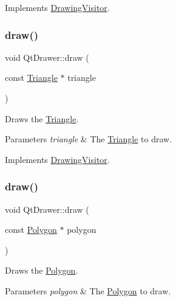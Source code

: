 Implements \hyperlink{class_drawing_visitor_a8a95018de31a7e3d7a067c347478ffde}{Drawing\+Visitor}.

\hypertarget{class_qt_drawer_a6d68080c84447a76b34810ca0330fd2c}{}\label{class_qt_drawer_a6d68080c84447a76b34810ca0330fd2c} 
\subsubsection{\texorpdfstring{draw()}{draw()}\hspace{0.1cm}{\footnotesize\ttfamily [3/5]}}
{\footnotesize\ttfamily void Qt\+Drawer\+::draw (\begin{DoxyParamCaption}\item[{const \hyperlink{class_triangle}{Triangle} $\ast$}]{triangle }\end{DoxyParamCaption})\hspace{0.3cm}{\ttfamily [virtual]}}

Draws the \hyperlink{class_triangle}{Triangle}. 
\begin{DoxyParams}{Parameters}
{\em triangle} & The \hyperlink{class_triangle}{Triangle} to draw. \\
\hline
\end{DoxyParams}


Implements \hyperlink{class_drawing_visitor_a178aa7e1bb9cfbd538d7de0dbfa2d4b1}{Drawing\+Visitor}.

\hypertarget{class_qt_drawer_a977cc5f97827eb36063f8429ef044727}{}\label{class_qt_drawer_a977cc5f97827eb36063f8429ef044727} 
\subsubsection{\texorpdfstring{draw()}{draw()}\hspace{0.1cm}{\footnotesize\ttfamily [4/5]}}
{\footnotesize\ttfamily void Qt\+Drawer\+::draw (\begin{DoxyParamCaption}\item[{const \hyperlink{class_polygon}{Polygon} $\ast$}]{polygon }\end{DoxyParamCaption})\hspace{0.3cm}{\ttfamily [virtual]}}

Draws the \hyperlink{class_polygon}{Polygon}. 
\begin{DoxyParams}{Parameters}
{\em polygon} & The \hyperlink{class_polygon}{Polygon} to draw. \\
\hline
\end{DoxyParams}


